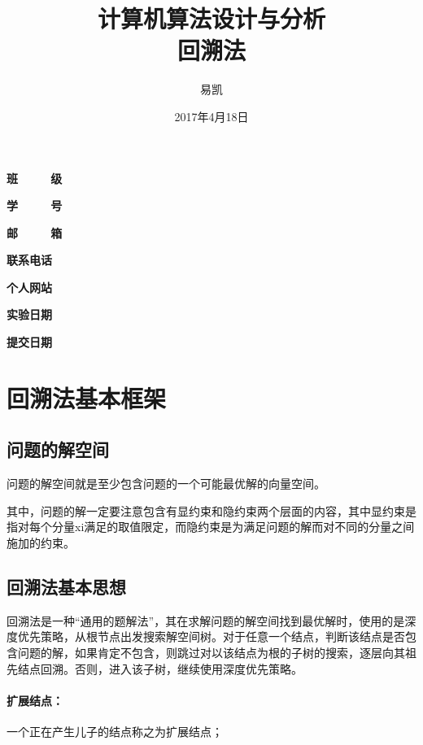 \documentclass[UTF8]{ctexart}
\title{\Huge{计算机算法设计与分析\\ 回溯法}}
\author{\Huge{易凯}}
\date{\Huge{2017年4月18日}}
\begin{document}
    \maketitle
    \vspace{35mm}
    \begin{flushright}
    \Large{
    \textbf{班\ \ \ \ \ 级} 

    \textbf{学\ \ \ \ \ 号} 

    \textbf{邮\ \ \ \ \ 箱} 

    \textbf{联系电话} 

    \textbf{个人网站} 


      \textbf{实验日期} 

    \textbf{提交日期} 
    }
    \end{flushright}

    \newpage
  	\tableofcontents
  	\newpage
  	\listoffigures
    \newpage

    \section{回溯法基本框架}
    \subsection{问题的解空间}
    问题的解空间就是至少包含问题的一个可能最优解的向量空间。

    其中，问题的解一定要注意包含有显约束和隐约束两个层面的内容，其中显约束是指对每个分量xi满足的取值限定，而隐约束是为满足问题的解而对不同的分量之间施加的约束。

    \subsection{回溯法基本思想}
    回溯法是一种“通用的题解法”，其在求解问题的解空间找到最优解时，使用的是深度优先策略，从根节点出发搜索解空间树。对于任意一个结点，判断该结点是否包含问题的解，如果肯定不包含，则跳过对以该结点为根的子树的搜索，逐层向其祖先结点回溯。否则，进入该子树，继续使用深度优先策略。

    \paragraph{扩展结点：} 一个正在产生儿子的结点称之为扩展结点；
\end{document}
